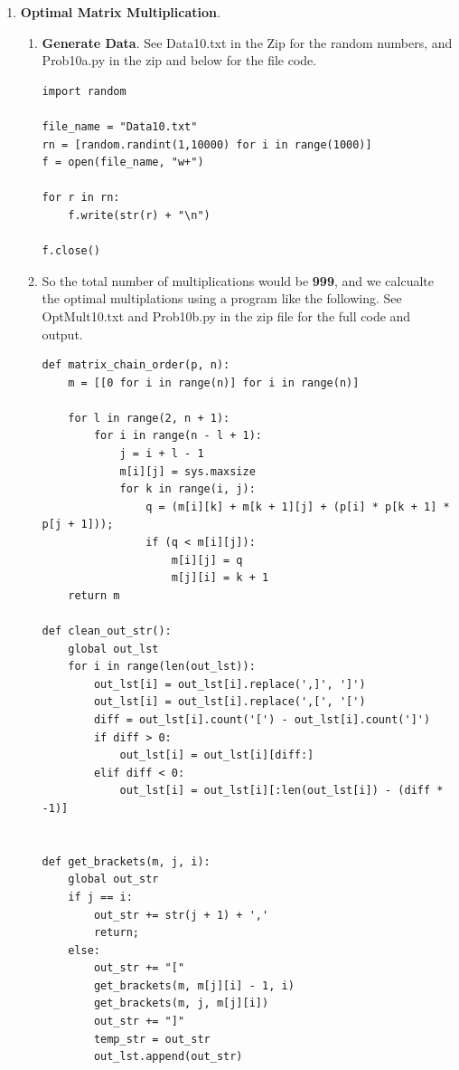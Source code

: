 \documentclass{article}
\begin{document}
\begin{enumerate}
\begin{enumerate}
\begin{lstlisting}
              s += str(e)
              s += ' \n'
      return s      
    \end{lstlisting}
  \end{enumerate}

  \item \textbf{Optimal Matrix Multiplication}.
  
  \begin{enumerate}
    \item \textbf{Generate Data}.
    See Data10.txt in the Zip for the random numbers, and Prob10a.py in the zip and below for the file code.

    \begin{lstlisting}
import random

file_name = "Data10.txt"
rn = [random.randint(1,10000) for i in range(1000)]
f = open(file_name, "w+")

for r in rn: 
    f.write(str(r) + "\n")

f.close()      
    \end{lstlisting}
    
    \item So the total number of multiplications would be \textbf{999}, and we calcualte the optimal multiplations using a program like the following. See OptMult10.txt and Prob10b.py in the zip file for the full code and output.
    
    \begin{lstlisting}
def matrix_chain_order(p, n):
    m = [[0 for i in range(n)] for i in range(n)] 
    
    for l in range(2, n + 1):
        for i in range(n - l + 1): 
            j = i + l - 1
            m[i][j] = sys.maxsize
            for k in range(i, j): 
                q = (m[i][k] + m[k + 1][j] + (p[i] * p[k + 1] * p[j + 1])); 
                if (q < m[i][j]): 
                    m[i][j] = q 
                    m[j][i] = k + 1
    return m

def clean_out_str():
    global out_lst
    for i in range(len(out_lst)):
        out_lst[i] = out_lst[i].replace(',]', ']')
        out_lst[i] = out_lst[i].replace(',[', '[')
        diff = out_lst[i].count('[') - out_lst[i].count(']')        
        if diff > 0:
            out_lst[i] = out_lst[i][diff:]
        elif diff < 0:
            out_lst[i] = out_lst[i][:len(out_lst[i]) - (diff * -1)]
        

def get_brackets(m, j, i):
    global out_str
    if j == i: 
        out_str += str(j + 1) + ','        
        return;
    else: 
        out_str += "["
        get_brackets(m, m[j][i] - 1, i) 
        get_brackets(m, j, m[j][i])
        out_str += "]"
        temp_str = out_str 
        out_lst.append(out_str)      
    \end{lstlisting}


\end{enumerate}
\end{enumerate}
\end{document}
